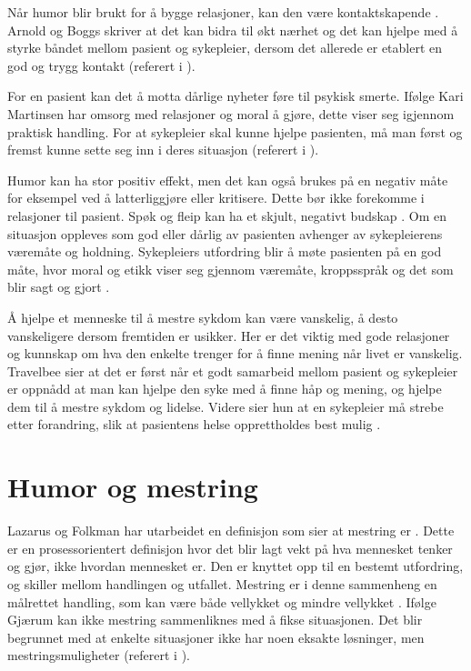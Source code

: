 Når humor blir brukt for å bygge relasjoner, kan den være kontaktskapende
\cite[s.~192]{spurkeland2002}. Arnold og Boggs skriver at det kan bidra til økt
nærhet og det kan hjelpe med å styrke båndet mellom pasient og sykepleier,
dersom det allerede er etablert en god og trygg kontakt (referert i
).

For en pasient kan det å motta dårlige nyheter føre til psykisk smerte. Ifølge
Kari Martinsen har omsorg med relasjoner og moral å gjøre, dette viser seg
igjennom praktisk handling. For at sykepleier skal kunne hjelpe pasienten, må
man  først og fremst kunne sette seg inn i deres situasjon (referert i
).

Humor kan ha stor positiv effekt, men det kan også brukes på en negativ måte
for eksempel ved å latterliggjøre eller kritisere. Dette bør ikke forekomme i
relasjoner til pasient. Spøk og fleip kan ha et skjult, negativt budskap
\cite[s.~246]{eide2008}. Om en situasjon oppleves som god eller dårlig av
pasienten avhenger av sykepleierens væremåte og holdning.  Sykepleiers
utfordring blir å møte pasienten på en god måte, hvor moral og etikk viser seg
gjennom væremåte, kroppsspråk og det som blir sagt og gjort
\cite[s.~127]{brinchmann2008}.

Å hjelpe et menneske til å mestre sykdom kan være vanskelig, å desto
vanskeligere dersom fremtiden er usikker. Her er det viktig med gode relasjoner
og kunnskap om hva den enkelte trenger for å finne mening når livet er
vanskelig. Travelbee sier at det er først når et godt samarbeid mellom pasient
og sykepleier er oppnådd at man kan hjelpe den syke med å finne håp og mening,
og hjelpe dem til å mestre sykdom og lidelse. Videre sier hun at en sykepleier
må strebe etter forandring, slik at pasientens helse opprettholdes best mulig
\cite[s.~30]{travelbee2001}.

\section{Humor og mestring}

Lazarus og Folkman har utarbeidet en definisjon som sier at mestring er
. Dette er en prosessorientert definisjon hvor
det blir lagt vekt på hva mennesket tenker og gjør, ikke hvordan mennesket er.
Den er knyttet opp til en bestemt utfordring, og skiller mellom handlingen og
utfallet. Mestring er i denne sammenheng en målrettet handling, som kan være
både vellykket og mindre vellykket \cite[s.~65]{heggen2010}. Ifølge Gjærum kan
ikke mestring sammenliknes med å fikse situasjonen. Det blir begrunnet med at
enkelte situasjoner ikke har noen eksakte løsninger, men mestringsmuligheter
(referert i ).

